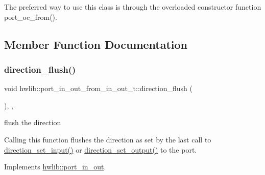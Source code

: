The preferred way to use this class is through the overloaded constructor function port\+\_\+oc\+\_\+from(). 

\subsection{Member Function Documentation}
\mbox{\label{classhwlib_1_1port__in__out__from__in__out__t_a4bf6d967ceda394a0de3d23fc9895072}} 
\subsubsection{\texorpdfstring{direction\+\_\+flush()}{direction\_flush()}}
{\footnotesize\ttfamily void hwlib\+::port\+\_\+in\+\_\+out\+\_\+from\+\_\+in\+\_\+out\+\_\+t\+::direction\+\_\+flush (\begin{DoxyParamCaption}{ }\end{DoxyParamCaption})\hspace{0.3cm}{\ttfamily [inline]}, {\ttfamily [override]}, {\ttfamily [virtual]}}

flush the direction

Calling this function flushes the direction as set by the last call to \hyperlink{classhwlib_1_1port__in__out__from__in__out__t_a49e31b927bbf0c677cc9e436459aae44}{direction\+\_\+set\+\_\+input()} or \hyperlink{classhwlib_1_1port__in__out__from__in__out__t_aa148c50e132f6657d4c3a292b91896da}{direction\+\_\+set\+\_\+output()} to the port. 

Implements \hyperlink{classhwlib_1_1port__in__out_a431b79eee48a21a93978bfdf6620f800}{hwlib\+::port\+\_\+in\+\_\+out}.

\mbox{\label{classhwlib_1_1port__in__out__from__in__out__t_a49e31b927bbf0c677cc9e436459aae44}} 
